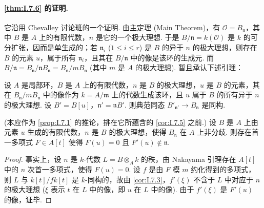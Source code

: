 \paragraph*{\ref{thm:I.7.6} 的证明.} 它沿用 Chevalley 讨论班的一个证明. 由主定理 (Main Theorem)，有 $\mathcal{O} = B_{\mathfrak{n}}$，其中 $B$ 是 $A$ 上的有限代数，$n$ 是它的一个极大理想. 于是 $B/\mathfrak{n} = k(\mathcal{O})$ 是 $k$ 的可分扩张，因而是单生成的；若 $\mathfrak{n}_i$ ($1 \leqslant i \leqslant r$) 是 $B$ 的异于 $n$ 的极大理想，则存在 $B$ 的元素 $u$，属于所有 $\mathfrak{n}_i$，且其在 $B/\mathfrak{n}$ 中的像是该环的生成元. 而 $B/\mathfrak{n} = B_{\mathfrak{n}}/\mathfrak{n}B_{\mathfrak{n}} = B_{\mathfrak{n}}/mB_{\mathfrak{n}}$ (其中 $m$ 是 $A$ 的极大理想). 暂且承认下述引理：

\begin{lemma}\label{lem:I.7.9}
设 $A$ 是局部环，$B$ 是 $A$ 上的有限代数，$n$ 是 $B$ 的极大理想，$u$ 是 $B$ 的元素，其在 $B_{\mathfrak{n}}/mB_{\mathfrak{n}}$ 中的像作为 $k = A/\mathfrak{m}$ 上的代数生成该环，且 $u$ 属于 $B$ 的所有异于 $n$ 的极大理想. 设 $B' = B[u]$，$\mathfrak{n}' = \mathfrak{n}B'$. 则典范同态 $B'_{\mathfrak{n}'} \to B_{\mathfrak{n}}$ 是同构.
\end{lemma}

\begin{lemma}\label{lem:I.7.10}
(本应作为 \ref{prop:I.7.1} 的推论，排在它所蕴含的 \ref{cor:I.7.5} 之前.) 设 $B$ 是 $A$ 上由元素 $u$ 生成的有限代数，$n$ 是 $B$ 的极大理想，使得 $B_{\mathfrak{n}}$ 在 $A$ 上非分歧. 则存在首一多项式 $F \in A[t]$ 使得 $F(u) = 0$ 且 $F'(u) \notin \mathfrak{n}$.
\end{lemma}

\begin{proof}
事实上，设 $n$ 是 $k$-代数 $L = B \otimes_A k$ 的秩，由 Nakayama 引理存在 $A[t]$ 中的 $n$ 次首一多项式，使得 $F(u) = 0$. 设 $f$ 是由 $F$ 模 $m$ 约化得到的多项式，则 $L$ 与 $k[t]/fk[t]$ 是 $k$-同构的，故由 \ref{cor:I.7.3}，$f'(\xi)$ 不含于 $L$ 中对应于 $n$ 的极大理想 ($\xi$ 表示 $t$ 在 $L$ 中的像，即 $u$ 在 $L$ 中的像). 由于 $f'(\xi)$ 是 $F'(u)$ 的像，证毕.
\end{proof}

